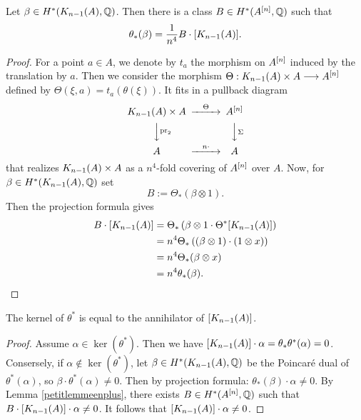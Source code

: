 \begin{lemma}\label{petitlemmeenplus}
 Let $\beta\in H^*(K_{n-1}(A),\Q)$. Then there is a class $B\in H^{*}(A\hilb{n},\Q)$ such that 
 $$\theta_*(\beta)=\frac{1}{n^4}B\cdot [\kum{A}{n-1}].$$
\end{lemma}
\begin{proof}
For a point $a\in A$, we denote by $t_a$ the morphism on $A\hilb{n}$ induced by the translation by $a$.
Then we consider the morphism $\Theta :\kum{A}{n-1}\times A \longrightarrow A\hilb{n}$ defined by $\Theta(\xi,a)=t_a(\theta(\xi))$. It fits in a pullback diagram
\begin{equation}
\begin{CD}
\kum{A}{n-1}\times A @>\Theta >> A\hilb{n}\\
@VV\pr_2V @VV\Sigma V\\
A @> n\cdot >> A
\end{CD}
\end{equation}
that realizes $\kum{A}{n-1}\times A$ as a $n^4$-fold covering of $A\hilb{n}$ over $A$.
Now, for $\beta\in H^*(K_{n-1}(A),\Q)$ set
$$
B:=\Theta_*(\beta\otimes 1).
$$
Then the projection formula gives
\begin{align*}
B\cdot [K_{n-1}(A)]&= \Theta_*\left(\beta\otimes 1\cdot \Theta^*[\kum{A}{n-1}]\right) \\
&=n^4 \Theta_*\left((\beta\otimes 1)\cdot  (1\otimes x)\right)\\
&=n^4 \Theta_*(\beta \otimes x)\\
&=n^4\theta_*(\beta).
\qedhere
\end{align*}
\end{proof}

\begin{proposition}\label{annihilator}
The kernel of $\theta^*$ is equal to the annihilator of $[\kum{A}{n-1}]$.
\end{proposition}
\begin{proof}
Assume $\alpha\in \ker(\theta^*)$. Then we have
$
[\kum{A}{n-1}]\cdot \alpha = \theta_*\theta^*(\alpha) = 0
$. 
Consersely, if $\alpha\notin \ker(\theta^*)$,
let $\beta\in H^*(\kum{A}{n-1},\Q)$ be the Poincar\'e dual of $\theta^*(\alpha)$, so $\beta\cdot \theta^*(\alpha)\neq 0$.
Then by projection formula:
$
\theta_*(\beta)\cdot \alpha\neq 0.
$
By Lemma \ref{petitlemmeenplus}, there exists $B\in H^*(A\hilb{n},\Q)$ such that 
$B\cdot [\kum{A}{n-1}]\cdot \alpha\neq 0$. It follows that $ [\kum{A}{n-1}]\cdot \alpha\neq 0$.
\end{proof}

